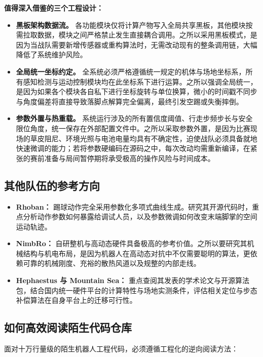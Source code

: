 \noindent\textbf{值得深入借鉴的三个工程设计：}

\begin{itemize}[leftmargin=*]
    \item \textbf{黑板架构数据流。} 各功能模块仅将计算产物写入全局共享黑板，其他模块按需拉取数据，模块之间严格禁止发生直接耦合调用。之所以采用黑板模式，是因为当战队需要新增传感器或重构算法时，无需改动现有的整条调用链，大幅降低了系统维护风险。
    \item \textbf{全局统一坐标约定。} 全系统必须严格遵循统一规定的机体与场地坐标系，所有感知检测与运动控制模块均在此坐标系下进行运算。之所以强调全局统一，是因为如果各个模块各自私下进行坐标旋转与单位换算，微小的时间戳不同步与角度偏差将直接导致落脚点解算完全偏离，最终引发空踢或失衡摔倒。
    \item \textbf{参数外置与热重载。} 系统运行涉及的所有置信度阈值、行走步频步长与安全限位角度，统一保存在外部配置文件中。之所以采取参数外置，是因为比赛现场的草皮阻尼、环境光照与电池电量均具有不确定性，迫使战队必须具备就地快速微调的能力；若将参数硬编码在源码之中，每次改动均需重新编译，在紧张的赛前准备与局间暂停期将承受极高的操作风险与时间成本。
\end{itemize}

\subsection{其他队伍的参考方向}

\begin{itemize}[leftmargin=*]
    \item \textbf{Rhoban：} 踢球动作完全采用参数化多项式曲线生成。研究其开源代码时，重点分析动作参数如何暴露给调试人员，以及参数微调如何改变末端脚掌的空间运动轨迹。
    \item \textbf{NimbRo：} 自研整机与高动态硬件具备极高的参考价值。之所以要研究其机械结构与机电布局，是因为机器人在高动态对抗中不仅需要聪明的算法，更依赖可靠的机械刚度、充裕的散热风道以及规整的内部走线。
    \item \textbf{Hephaestus 与 Mountain Sea：} 重点查阅其发表的学术论文与开源算法包，结合国内统一硬件平台的计算特性与场地实测条件，评估相关定位与步态补偿算法在自身平台上的迁移可行性。\advice
\end{itemize}

\subsection{如何高效阅读陌生代码仓库}

面对十万行量级的陌生机器人工程代码，必须遵循工程化的逆向阅读方法：

